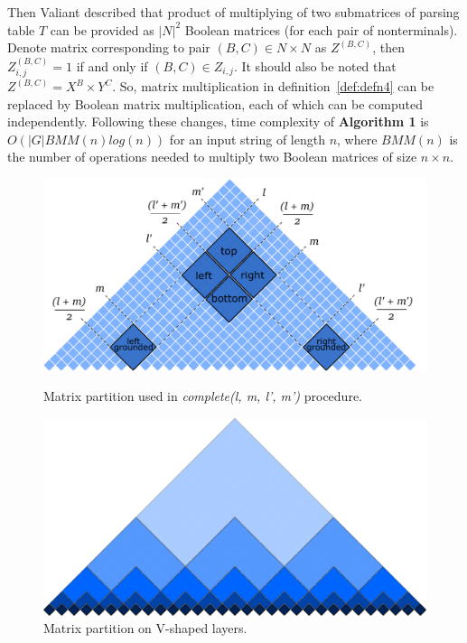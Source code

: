 Then Valiant described that product of multiplying of two submatrices of parsing table $T$ can be provided as $|N|^2$ Boolean matrices (for each pair of nonterminals). Denote matrix corresponding to pair $(B, C) \in N \times N$ as $Z^{(B, C)}$, then $Z_{i, j}^{(B, C)} = 1$ if and only if $(B, C) \in Z_{i, j}$. It should also be noted that $Z^{(B, C)} = X^{B} \times Y^{C}$. So, matrix multiplication in definition~\ref{def:defn4} can be replaced by Boolean matrix multiplication, each of which can be computed independently. Following these changes, time complexity of \textbf{Algorithm 1} is $O(|G|BMM(n)log(n))$ for an input string of length $n$, where $BMM(n)$ is the number of operations needed to multiply two Boolean matrices of size $n \times n$.

\begin{figure}
    \centering
    \captionsetup{justification=centering}
    \begin{minipage}{0.45\textwidth}
        \centering
        \includegraphics[width=1\textwidth]{pictures/splitting_with_grounded.pdf}
        \caption{Matrix partition used in \linebreak \textit{complete(l, m, l', m')} procedure.}
        \label{fig2}
    \end{minipage}\hfill
    \begin{minipage}{0.45\textwidth}
        \centering
        \includegraphics[width=1\textwidth]{pictures/layers.pdf}
        \caption{Matrix partition on V-shaped layers.}
        \label{fig3}
    \end{minipage}
\end{figure}
